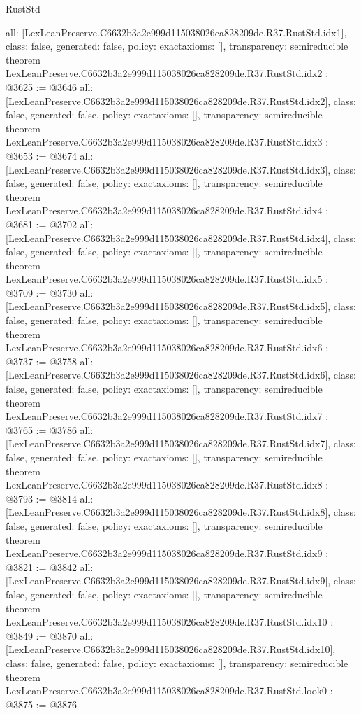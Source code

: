 \begin{lexlean}{RustStd}
\begin{coremodule}
{  all: [LexLeanPreserve.C6632b3a2e999d115038026ca828209de.R37.RustStd.idx1],
  class: false,
  generated: false,
  policy: exact{axioms: []},
  transparency: semireducible
}
theorem LexLeanPreserve.C6632b3a2e999d115038026ca828209de.R37.RustStd.idx2 : @3625 := @3646 {
  all: [LexLeanPreserve.C6632b3a2e999d115038026ca828209de.R37.RustStd.idx2],
  class: false,
  generated: false,
  policy: exact{axioms: []},
  transparency: semireducible
}
theorem LexLeanPreserve.C6632b3a2e999d115038026ca828209de.R37.RustStd.idx3 : @3653 := @3674 {
  all: [LexLeanPreserve.C6632b3a2e999d115038026ca828209de.R37.RustStd.idx3],
  class: false,
  generated: false,
  policy: exact{axioms: []},
  transparency: semireducible
}
theorem LexLeanPreserve.C6632b3a2e999d115038026ca828209de.R37.RustStd.idx4 : @3681 := @3702 {
  all: [LexLeanPreserve.C6632b3a2e999d115038026ca828209de.R37.RustStd.idx4],
  class: false,
  generated: false,
  policy: exact{axioms: []},
  transparency: semireducible
}
theorem LexLeanPreserve.C6632b3a2e999d115038026ca828209de.R37.RustStd.idx5 : @3709 := @3730 {
  all: [LexLeanPreserve.C6632b3a2e999d115038026ca828209de.R37.RustStd.idx5],
  class: false,
  generated: false,
  policy: exact{axioms: []},
  transparency: semireducible
}
theorem LexLeanPreserve.C6632b3a2e999d115038026ca828209de.R37.RustStd.idx6 : @3737 := @3758 {
  all: [LexLeanPreserve.C6632b3a2e999d115038026ca828209de.R37.RustStd.idx6],
  class: false,
  generated: false,
  policy: exact{axioms: []},
  transparency: semireducible
}
theorem LexLeanPreserve.C6632b3a2e999d115038026ca828209de.R37.RustStd.idx7 : @3765 := @3786 {
  all: [LexLeanPreserve.C6632b3a2e999d115038026ca828209de.R37.RustStd.idx7],
  class: false,
  generated: false,
  policy: exact{axioms: []},
  transparency: semireducible
}
theorem LexLeanPreserve.C6632b3a2e999d115038026ca828209de.R37.RustStd.idx8 : @3793 := @3814 {
  all: [LexLeanPreserve.C6632b3a2e999d115038026ca828209de.R37.RustStd.idx8],
  class: false,
  generated: false,
  policy: exact{axioms: []},
  transparency: semireducible
}
theorem LexLeanPreserve.C6632b3a2e999d115038026ca828209de.R37.RustStd.idx9 : @3821 := @3842 {
  all: [LexLeanPreserve.C6632b3a2e999d115038026ca828209de.R37.RustStd.idx9],
  class: false,
  generated: false,
  policy: exact{axioms: []},
  transparency: semireducible
}
theorem LexLeanPreserve.C6632b3a2e999d115038026ca828209de.R37.RustStd.idx10 : @3849 := @3870 {
  all: [LexLeanPreserve.C6632b3a2e999d115038026ca828209de.R37.RustStd.idx10],
  class: false,
  generated: false,
  policy: exact{axioms: []},
  transparency: semireducible
}
theorem LexLeanPreserve.C6632b3a2e999d115038026ca828209de.R37.RustStd.look0 : @3875 := @3876 {
}
\end{coremodule}
\end{lexlean}
